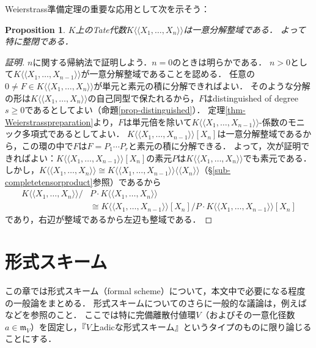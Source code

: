 \documentclass[a4paper,12pt, dvipdfmx]{jsbook}
\def\m{\mathfrak{m}}
\def\dl{\langle\!\langle}
\def\dr{\rangle\!\rangle}
\theoremstyle{plain}
\newtheorem{prop}[thm]{\bfseries Proposition}
\theoremstyle{definition}
\newcounter{chushaku}
\begin{document}
Weierstrass準備定理の重要な応用として次を示そう：
\begin{prop}\label{prop-factorialTate}{\rm 
$K$上のTate代数$K\dl X_1,\ldots,X_n\dr$は一意分解整域である．
よって特に整閉である．}
\end{prop}

\begin{proof}[証明]
$n$に関する帰納法で証明しよう．$n=0$のときは明らかである．
$n>0$として$K\dl X_1,\ldots,X_{n-1}\dr$が一意分解整域であることを認める．
任意の$0\neq F\in K\dl X_1,\ldots,X_n\dr$が単元と素元の積に分解できればよい．
そのような分解の形は$K\dl X_1,\ldots,X_n\dr$の自己同型で保たれるから，$F$はdistinguished of degree $s\geq 0$であるとしてよい（命題\ref{prop-distinguished}）．
定理\ref{thm-Weierstrasspreparation}より，$F$は単元倍を除いて$K\dl X_1,\ldots,X_{n-1}\dr$-係数のモニック多項式であるとしてよい．
$K\dl X_1,\ldots,X_{n-1}\dr[X_n]$は一意分解整域であるから，この環の中で$F$は$F=P_1\cdots P_r$と素元の積に分解できる．
よって，次が証明できればよい：$K\dl X_1,\ldots,X_{n-1}\dr[X_n]$の素元$P$は$K\dl X_1,\ldots,X_n\dr$でも素元である．
しかし，$K\dl X_1,\ldots,X_n\dr\cong K\dl X_1,\ldots,X_{n-1}\dr\dl X_n\dr$（\S\ref{sub-completetensorproduct}参照）であるから
\begin{equation*}
\begin{split}
K\dl X_1,\ldots,X_n\dr/&P\cdot K\dl X_1,\ldots,X_n\dr\\ &\cong K\dl X_1,\ldots,X_{n-1}\dr[X_n]/P\cdot K\dl X_1,\ldots,X_{n-1}\dr[X_n]
\end{split}
\end{equation*}
であり，右辺が整域であるから左辺も整域である．
\end{proof}







\setcounter{chushaku}{0}
\chapter{形式スキーム}\label{CH-FORMALSCHEMES}
この章では形式スキーム（formal scheme）について，本文中で必要になる程度の一般論をまとめる．
形式スキームについてのさらに一般的な議論は，例えば\cite[$\mathbf{I}$, \S10]{EGA}などを参照のこと．
ここでは特に完備離散付値環$V$（およびその一意化径数$a\in\m_V$）を固定し，『$V$上adicな形式スキーム』というタイプのものに限り論じることにする．
\end{document}
